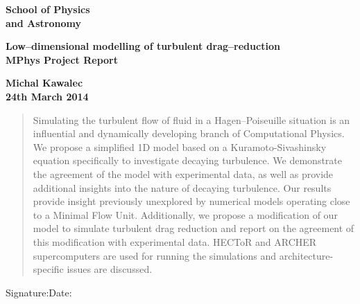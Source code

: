 \documentclass[11pt,a4paper]{article}
\begin{document}
\epsfxsize=40mm
\begin{minipage}[b]{110mm}
    {\Huge\bf School of Physics \\and Astronomy
    \vspace*{17mm}}
\end{minipage}
\hfill
\begin{minipage}[b]{40mm}
\end{minipage}
\par\noindent

\begin{center}
    \Large\bf Low--dimensional modelling of turbulent drag--reduction\\
    \Large\bf MPhys Project Report
\end{center}
\vspace*{1.5cm}
\begin{center}
    \bf Michal Kawalec\\
    24th March 2014
\end{center}
\vspace*{5mm}

\begin{abstract}
Simulating the turbulent flow of fluid in a Hagen–Poiseuille situation is an influential and dynamically developing branch of Computational Physics.
    We propose a simplified 1D model based on a Kuramoto-Sivashinsky equation specifically to investigate decaying turbulence.
    We demonstrate the agreement of the model with experimental data, as well as provide additional insights into the nature of decaying turbulence. Our results provide insight previously unexplored by numerical models operating close to a Minimal Flow Unit.
    Additionally, we propose a modification of our model to simulate turbulent drag reduction and report on the agreement of this modification with experimental data.
    HECToR and ARCHER supercomputers are used for running the simulations and architecture-specific issues are discussed.
\end{abstract}
\vspace*{1cm}
\vspace*{3cm}
Signature:\hspace*{8cm}Date:
\end{document}
